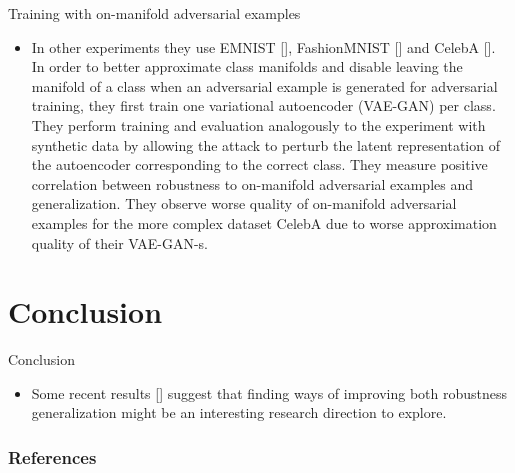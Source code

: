 \documentclass{beamer}
\newcommand{\citep}[1]{{\color{citecolor}\relscale{0.8}[\textcite{#1}]}}
\begin{document}
\begin{frame}[allowframebreaks=0.9]{Training with on-manifold adversarial examples}
\begin{itemize}
		\item In other experiments they use EMNIST \citep{Cohen:2017:EMNIST}, FashionMNIST \citep{Xiao:2017:FMNIDBMLA} and CelebA \citep{Liu:2015:DLFAW}. In order to better approximate class manifolds and disable leaving the manifold of a class when an adversarial example is generated for adversarial training, they first train one variational autoencoder (VAE-GAN) per class. They perform training and evaluation analogously to the experiment with synthetic data by allowing the attack to perturb the latent representation of the autoencoder corresponding to the correct class. They measure positive correlation between robustness to on-manifold adversarial examples and generalization. They observe worse quality of on-manifold adversarial examples for the more complex dataset CelebA due to worse approximation quality of their VAE-GAN-s.
	\end{itemize}
\end{frame}

\section{Conclusion} \label{sec:conclusion}

\begin{frame}[allowframebreaks=0.9]{Conclusion}
	\begin{itemize}
		\item Some recent results \citep{Stutz:2018:DARG} suggest that finding ways of improving both robustness generalization might be an interesting research direction to explore.
	\end{itemize}
\end{frame}

\begin{frame}[allowframebreaks=0.9]
	\frametitle{References}
	{\printbibliography}
\end{frame}

\appendix

\appendsubframes
\end{document}
